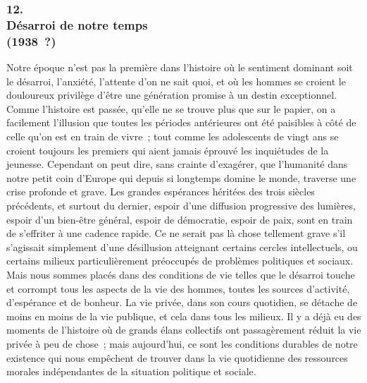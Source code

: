 \documentclass[french,twoside]{book} %
\begin{document}
\subsubsection[{12. Désarroi de notre temps, (1938 ?)}]{12. \\
Désarroi de notre temps \\
(1938 ?)}
\noindent \par
Notre époque n'est pas la première dans l'histoire où le sentiment dominant soit le désarroi, l'anxiété, l'attente d'on ne sait quoi, et où les hommes se croient le douloureux privilège d'être une génération promise à un destin exceptionnel. Comme l'histoire est passée, qu'elle ne se trouve plus que sur le papier, on a facilement l'illusion que toutes les périodes antérieures ont été paisibles à côté de celle qu'on est en train de vivre ; tout comme les adoles­cents de vingt ans se croient toujours les premiers qui aient jamais éprouvé les inquiétudes de la jeunesse. Cependant on peut dire, sans crainte d'exagérer, que l'humanité dans notre petit coin d'Europe qui depuis si longtemps domine le monde, traverse une crise profonde et grave. Les grandes espérances héri­tées des trois siècles précédents, et surtout du dernier, espoir d'une diffusion progressive des lumières, espoir d'un bien-être général, espoir de démocratie, espoir de paix, sont en train de s'effriter à une cadence rapide. Ce ne serait pas là chose tellement grave s'il s'agissait simplement d'une désillusion atteignant certains cercles intellectuels, ou certains milieux particulièrement préoccupés de problèmes politiques et sociaux. Mais nous sommes placés dans des conditions de vie telles que le désarroi touche et corrompt tous les aspects de la vie des hommes, toutes les sources d'activité, d'espérance et de bonheur. La vie privée, dans son cours quotidien, se détache de moins en moins de la vie publique, et cela dans tous les milieux. Il y a déjà eu des moments de l'histoire où de grands élans collectifs ont passagèrement réduit la vie privée à peu de chose ; mais aujourd'hui, ce sont les conditions durables de notre existence qui nous empêchent de trouver dans la vie quotidienne des ressources morales indépendantes de la situation politique et sociale.\par
\end{document}
